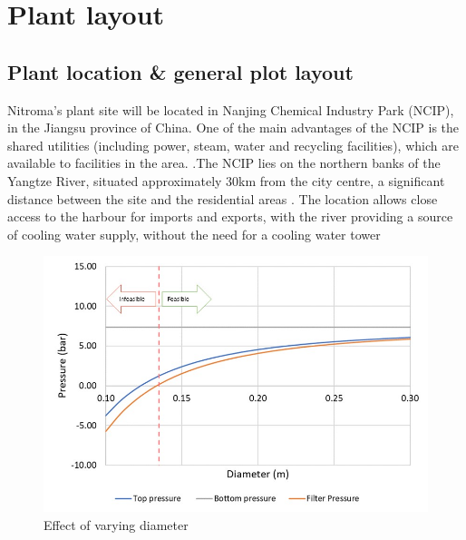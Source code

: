 \section{Plant layout}

\subsection{Plant location \& general plot layout}

Nitroma’s plant site will be located in Nanjing Chemical Industry Park (NCIP), in the Jiangsu province of China. One of the main advantages of the NCIP is the shared utilities (including power, steam, water and recycling facilities), which are available to facilities in the area. \cite{independent_commodity_intelligence_services_china_2007}.The NCIP lies on the northern banks of the Yangtze River, situated approximately 30km from the city centre, a significant distance between the site and the residential areas \cite{zeng_divergent_2011}. The location allows close access to the harbour for imports and exports, with the river providing a source of cooling water supply, without the need for a cooling water tower

\begin{figure}
\centering
\includegraphics[width=\linewidth]{chapters/3-separation/figures/diameter.jpg}
\caption{Effect of varying diameter}
\label{fig:dia_col}
\end{figure}

